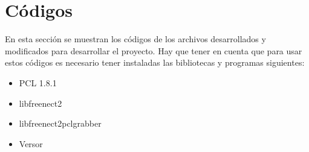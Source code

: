 
\section{Códigos}
%
En esta sección se muestran los códigos de los archivos desarrollados y modificados para desarrollar el proyecto. Hay que tener en cuenta que para usar estos códigos es necesario tener instaladas las bibliotecas y programas siguientes:
\begin{itemize}
	\item PCL 1.8.1 \cite{Rusu_ICRA2011_PCL}
	\item libfreenect2 \cite{libfreenect}
	\item libfreenect2pclgrabber \cite{k2g}
	\item Versor \cite{versor}
\end{itemize}

